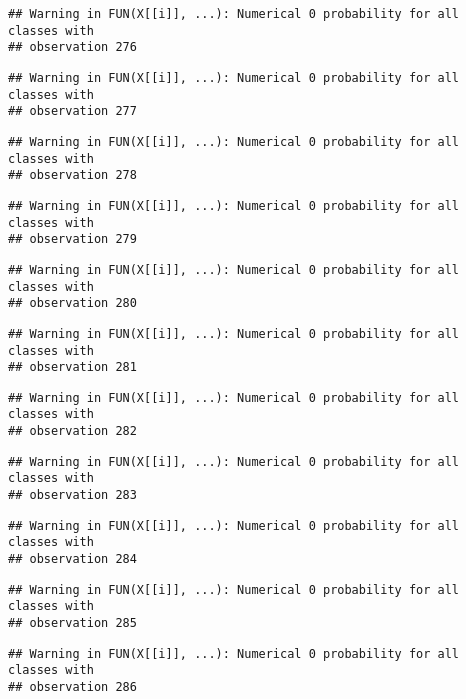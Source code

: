 \documentclass[
]{article}
\begin{document}
\begin{verbatim}
## Warning in FUN(X[[i]], ...): Numerical 0 probability for all classes with
## observation 276
\end{verbatim}

\begin{verbatim}
## Warning in FUN(X[[i]], ...): Numerical 0 probability for all classes with
## observation 277
\end{verbatim}

\begin{verbatim}
## Warning in FUN(X[[i]], ...): Numerical 0 probability for all classes with
## observation 278
\end{verbatim}

\begin{verbatim}
## Warning in FUN(X[[i]], ...): Numerical 0 probability for all classes with
## observation 279
\end{verbatim}

\begin{verbatim}
## Warning in FUN(X[[i]], ...): Numerical 0 probability for all classes with
## observation 280
\end{verbatim}

\begin{verbatim}
## Warning in FUN(X[[i]], ...): Numerical 0 probability for all classes with
## observation 281
\end{verbatim}

\begin{verbatim}
## Warning in FUN(X[[i]], ...): Numerical 0 probability for all classes with
## observation 282
\end{verbatim}

\begin{verbatim}
## Warning in FUN(X[[i]], ...): Numerical 0 probability for all classes with
## observation 283
\end{verbatim}

\begin{verbatim}
## Warning in FUN(X[[i]], ...): Numerical 0 probability for all classes with
## observation 284
\end{verbatim}

\begin{verbatim}
## Warning in FUN(X[[i]], ...): Numerical 0 probability for all classes with
## observation 285
\end{verbatim}

\begin{verbatim}
## Warning in FUN(X[[i]], ...): Numerical 0 probability for all classes with
## observation 286
\end{verbatim}
\end{document}
